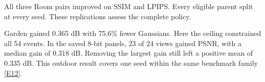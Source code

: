 All three Room pairs improved on SSIM and LPIPS. Every eligible parent split at every seed. These replications assess the complete policy.

Garden gained 0.365 dB with 75.6\% fewer Gaussians. Here the ceiling constrained all 54 events. In the saved 8-bit panels, 23 of 24 views gained PSNR, with a median gain of 0.318 dB. Removing the largest gain still left a positive mean of 0.335 dB. This outdoor result covers one seed within the same benchmark family [\hyperlink{evE12}{E12}].
